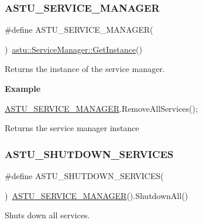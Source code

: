 \subsubsection{\texorpdfstring{A\+S\+T\+U\+\_\+\+S\+E\+R\+V\+I\+C\+E\+\_\+\+M\+A\+N\+A\+G\+ER}{ASTU\_SERVICE\_MANAGER}}
{\footnotesize\ttfamily \#define A\+S\+T\+U\+\_\+\+S\+E\+R\+V\+I\+C\+E\+\_\+\+M\+A\+N\+A\+G\+ER(\begin{DoxyParamCaption}{ }\end{DoxyParamCaption})~\hyperlink{classastu_1_1ServiceManager_a26941fe98ea3f2792deca62e4124bf15}{astu\+::\+Service\+Manager\+::\+Get\+Instance}()}

Returns the instance of the service manager.

{\bfseries Example}


\begin{DoxyCode}
\hyperlink{group__srv__group_ga5216c57cf872d6a0c05d0e6f33c66fc7}{ASTU\_SERVICE\_MANAGER}.RemoveAllServices();
\end{DoxyCode}


\begin{DoxyReturn}{Returns}
the service manager instance 
\end{DoxyReturn}
\mbox{\label{group__srv__group_ga97369e673940c499b1cd623c76aaafe5}} 
\subsubsection{\texorpdfstring{A\+S\+T\+U\+\_\+\+S\+H\+U\+T\+D\+O\+W\+N\+\_\+\+S\+E\+R\+V\+I\+C\+ES}{ASTU\_SHUTDOWN\_SERVICES}}
{\footnotesize\ttfamily \#define A\+S\+T\+U\+\_\+\+S\+H\+U\+T\+D\+O\+W\+N\+\_\+\+S\+E\+R\+V\+I\+C\+ES(\begin{DoxyParamCaption}{ }\end{DoxyParamCaption})~\hyperlink{group__srv__group_ga5216c57cf872d6a0c05d0e6f33c66fc7}{A\+S\+T\+U\+\_\+\+S\+E\+R\+V\+I\+C\+E\+\_\+\+M\+A\+N\+A\+G\+ER}().Shutdown\+All()}

Shuts down all services. \mbox{\label{group__srv__group_gab16fd0e9f158b318812197ee283a8484}} 

